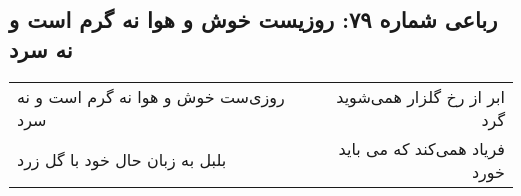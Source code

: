 \begin{center}
\section*{رباعی شماره ۷۹: روزیست خوش و هوا نه گرم است و نه سرد}
\label{sec:sh079}
\begin{longtable}{l p{0.5cm} r}
روزی‌ست خوش و هوا نه گرم است و نه سرد
&&
ابر از رخ گلزار همی‌شوید گرد
\\
بلبل به زبان حال خود با گل زرد
&&
فریاد همی‌کند که می باید خورد
\\
\end{longtable}
\end{center}
